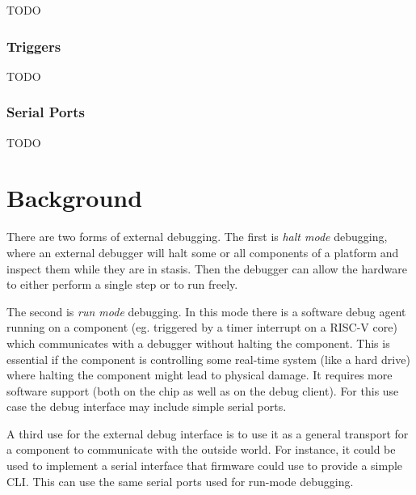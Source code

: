 \documentclass{article}
\begin{document}
TODO

\subsubsection{Triggers}

TODO

\subsubsection{Serial Ports}

TODO

\section{Background}

There are two forms of external debugging. The first is \emph{halt mode}
debugging, where an external debugger will halt some or all components of a
platform and inspect them while they are in stasis. Then the debugger can allow
the hardware to either perform a single step or to run freely.

The second is \emph{run mode} debugging.  In this mode there is a software
debug agent running on a component (eg.  triggered by a timer interrupt on a
RISC-V core) which communicates with a debugger without halting the component.
This is essential if the component is controlling some real-time system (like a
hard drive) where halting the component might lead to physical damage. It
requires more software support (both on the chip as well as on the debug
client).  For this use case the debug interface may include simple serial
ports.

A third use for the external debug interface is to use it as a general
transport for a component to communicate with the outside world. For instance,
it could be used to implement a serial interface that firmware could use to
provide a simple CLI. This can use the same serial ports used for run-mode
debugging.
\end{document}
